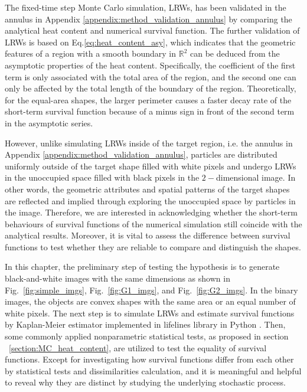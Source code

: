 
The fixed-time step Monte Carlo simulation, LRWs, has been validated
in the annulus in Appendix \ref{appendix:method_validation_annulus} by
comparing the analytical heat content and numerical survival
function. The further validation of LRWs is based on
Eq.\ref{eq:heat_content_asy}, which indicates that the geometric
features of a region with a smooth boundary in $\mathbb{R}^2$ can be
deduced from the asymptotic properties of the heat
content. Specifically, the coefficient of the first term is only
associated with the total area of the region, and the second one can
only be affected by the total length of the boundary of the
region. Theoretically, for the equal-area shapes, the larger perimeter
causes a faster decay rate of the short-term survival function because
of a minus sign in front of the second term in the asymptotic series.


However, unlike simulating LRWs inside of the target region, i.e. the
annulus in Appendix \ref{appendix:method_validation_annulus},
particles are distributed uniformly outside of the target shape filled
with white pixels and undergo LRWs in the unoccupied space filled with
black pixels in the $2-$dimensional image. In other words, the
geometric attributes and spatial patterns of the target shapes are
reflected and implied through exploring the unoccupied space by
particles in the image. Therefore, we are interested in acknowledging
whether the short-term behaviours of survival functions of the
numerical simulation still coincide with the analytical
results. Moreover, it is vital to assess the difference between
survival functions to test whether they are reliable to compare and
distinguish the shapes. 


In this chapter, the preliminary step of testing the hypothesis is to
generate black-and-white images with the same dimensions as shown in
Fig.~\ref{fig:simple_imgs}, Fig.~\ref{fig:G1_imgs}, and
Fig.~\ref{fig:G2_imgs}. In the binary images, the objects are convex
shapes with the same area or an equal number of white pixels. The next
step is to simulate LRWs and estimate survival functions by
Kaplan-Meier estimator \cite{kaplan1958nonparametric} implemented in
lifelines library in Python
\cite{cameron_davidson_pilon_2021_4505728}. Then, some commonly
applied nonparametric statistical tests, as proposed in section
~\ref{section:MC_heat_content}, are utilized to test the equality of
survival functions. Except for investigating how survival functions
differ from each other by statistical tests and dissimilarities
calculation, and it is meaningful and helpful to reveal why they are
distinct by studying the underlying stochastic process.
